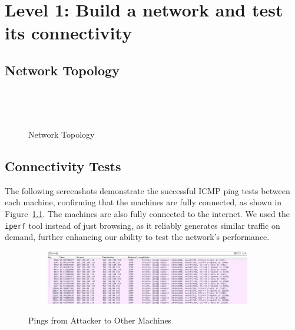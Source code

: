 \chapter{Level 1: Build a network and test its connectivity}

\section{Network Topology}

\begin{figure}[H]
  \centering
  \caption{Network Topology}\label{fig:NetworkTopology}
\end{figure}

\section{Connectivity Tests}

The following screenshots demonstrate the successful ICMP ping tests between each machine, confirming that the machines are fully connected, as shown in Figure~\ref{fig:NetworkTopology}. The machines are also fully connected to the internet. We used the \texttt{iperf} tool instead of just browsing, as it reliably generates similar traffic on demand, further enhancing our ability to test the network's performance.

\begin{figure}[H]
  \centering
  \includegraphics[width=0.8\textwidth]{img/level1/level1-192-168-96-110.png}
  \caption{Pings from Attacker to Other Machines}\label{fig:PingAttacker}
\end{figure}

